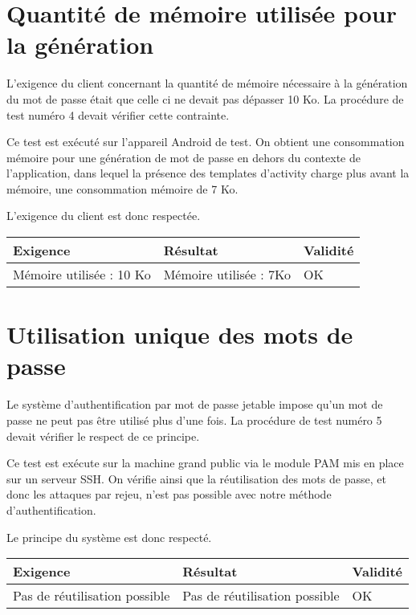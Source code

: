 \documentclass{"../../res/univ-projet"}
\begin{document}
	\section{Quantité de mémoire utilisée pour la génération}    
	L'exigence du client concernant la quantité de mémoire nécessaire à la génération du mot de passe
	était que celle ci ne devait pas dépasser 10 Ko. La procédure de test numéro 4 devait vérifier
	cette contrainte.
	
	Ce test est exécuté sur l'appareil Android de test. On obtient une consommation mémoire pour une 
	génération de mot de passe en dehors du contexte de l'application, dans lequel la présence des
	templates d'activity charge plus avant la mémoire, une consommation mémoire de 7 Ko.
	
	L'exigence du client est donc respectée.
	\begin{center}	
		\begin{tabular}{| p{6cm} | p{6cm} | p{2cm} |}
			\hline
			\cellcolor{lightgray} Exigence & \cellcolor{lightgray} Résultat & 
			\cellcolor{lightgray} Validité \\ \hline
		
			Mémoire utilisée : 10 Ko & Mémoire utilisée : 7Ko & \cellcolor{green} OK \\ \hline
		\end{tabular}
	\end{center}
	
	\section{Utilisation unique des mots de passe}
	Le système d'authentification par mot de passe jetable impose qu'un mot de passe ne peut pas être
	utilisé plus d'une fois. La procédure de test numéro 5 devait vérifier le respect de ce principe.
	
	Ce test est exécute sur la machine grand public via le module PAM mis en place sur un serveur SSH. On
	vérifie ainsi que la réutilisation des mots de passe, et donc les attaques par rejeu, n'est pas possible
	avec notre méthode d'authentification.
	
	Le principe du système est donc respecté.
	\begin{center}	
		\begin{tabular}{| p{6cm} | p{6cm} | p{2cm} |}
			\hline
			\cellcolor{lightgray} Exigence & \cellcolor{lightgray} Résultat & 
			\cellcolor{lightgray} Validité \\ \hline
		
			Pas de réutilisation possible& Pas de réutilisation possible & \cellcolor{green} OK \\ \hline
		\end{tabular}
	\end{center}
    
\end{document}
